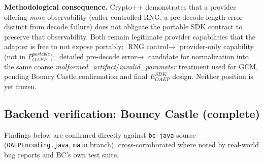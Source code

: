 \documentclass[11pt,a4paper]{article}
\begin{document}
\textbf{Methodological consequence.} Crypto++ demonstrates that a provider offering \emph{more} observability (caller-controlled RNG, a pre-decode length error distinct from decode failure) does not obligate the portable SDK contract to preserve that observability. Both remain legitimate provider capabilities that the adapter is free to not expose portably: $\text{RNG control} \to$ provider-only capability (not in $P_{OAEP}^{portable}$); $\text{detailed pre-decode error} \to$ candidate for normalization into the same coarse \emph{malformed\_artifact}/\emph{invalid\_parameter} treatment used for GCM, pending Bouncy Castle confirmation and final $E_{OAEP}^{SDK}$ design. Neither position is yet frozen.

\subsection{Backend verification: Bouncy Castle (complete)}
Findings below are confirmed directly against \texttt{bc-java} source (\texttt{OAEPEncoding.java}, \texttt{main} branch), cross-corroborated where noted by real-world bug reports and BC's own test suite.
\end{document}
